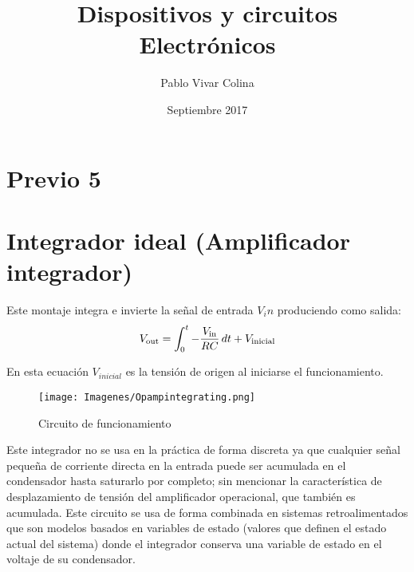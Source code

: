 \documentclass{article}
\title{Dispositivos y circuitos Electrónicos}
\author{Pablo Vivar Colina}
\date{Septiembre 2017}
\begin{document}
\maketitle


\section{Previo 5}

\section{Integrador ideal (Amplificador integrador)}

Este montaje integra e invierte la señal de entrada $V_in$ produciendo como salida:\\

\begin{equation}
    V_{\rm out} = \int_0^t - {V_{\rm in} \over RC} \, dt + V_{\rm inicial}
\end{equation}

En esta ecuación $V_{inicial}$ es la tensión de origen al iniciarse el funcionamiento.\\

\begin{figure}[h!]
    \centering
    \texttt{[image: Imagenes/Opampintegrating.png]}
    \caption{Circuito de funcionamiento}
    \label{fig:my_label}
\end{figure}

Este integrador no se usa en la práctica de forma discreta ya que cualquier señal pequeña de corriente directa en la entrada puede ser acumulada en el condensador hasta saturarlo por completo; sin mencionar la característica de desplazamiento de tensión del amplificador operacional, que también es acumulada. Este circuito se usa de forma combinada en sistemas retroalimentados que son modelos basados en variables de estado (valores que definen el estado actual del sistema) donde el integrador conserva una variable de estado en el voltaje de su condensador.\citep{opampWiki}\\





\end{document}
